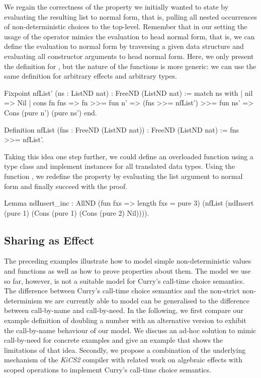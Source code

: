We regain the correctness of the property we initially wanted to state by evaluating the resulting list to normal form, that is, pulling all nested occurrences of non\--deterministic choices to the top\--level.
Remember that in our setting the usage of the operator \cinl{>>=} mimics the evaluation to head normal form, that is, we can define the evaluation to normal form by traversing a given data structure and evaluating all constructor arguments to head normal form.
Here, we only present the definition for , but the nature of the functions is more generic: we can use the same definition for arbitrary effects and arbitrary types.

\begin{coqcode}
Fixpoint nfList' (ns : ListND nat) : FreeND (ListND nat) :=
 match ns with
 | nil         => Nil
 | cons fn fns => fn >>= fun n' =>
                  (fns >>= nfList') >>= fun ns' =>
                  Cons (pure n') (pure ns')
 end.

Definition nfList (fns : FreeND (ListND nat)) : FreeND (ListND nat) :=
 fns >>= nfList'.
\end{coqcode}

Taking this idea one step further, we could define an overloaded function  using a type class and implement instances for all translated data types.
Using the function , we redefine the property by evaluating the list argument to normal form and finally succeed with the proof.

\begin{coqcode}
Lemma ndInsert_inc :
  AllND (fun fxs => length fxs = pure 3)
        (nfList (ndInsert (pure 1) (Cons (pure 1) (Cons (pure 2) Nil)))).
\end{coqcode}

\subsection{Sharing as Effect}
\label{subsec:sharingEffect}

The preceding examples illustrate how to model simple non\--deterministic values and functions as well as how to prove properties about them.
The model we use so far, however, is not a suitable model for Curry's call\--time choice semantics.
The difference between Curry's call\--time choice semantics and the non\--strict non\--determinism we are currently able to model can be generalised to the difference between call\--by\--name and call\--by\--need.
In the following, we first compare our example definition of doubling a number with an alternative version to exhibit the call\--by\--name behaviour of our model.
We discuss an ad\--hoc solution to mimic call\--by\--need for concrete examples and give an example that shows the limitations of that idea.
Secondly, we propose a combination of the underlying mechanism of the \emph{KiCS2} compiler with related work on algebraic effects with scoped operations to implement Curry's call\--time choice semantics.

